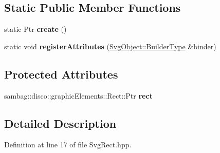 \subsection*{Static Public Member Functions}
\begin{DoxyCompactItemize}
\item 
\hypertarget{classsambag_1_1disco_1_1svg_1_1_svg_rect_aef9401a232a2222cfaa23405833ce3c0}{
static Ptr {\bfseries create} ()}
\label{classsambag_1_1disco_1_1svg_1_1_svg_rect_aef9401a232a2222cfaa23405833ce3c0}

\item 
\hypertarget{classsambag_1_1disco_1_1svg_1_1_svg_rect_af04b290fa1361836ebe9eb1b7477bbe3}{
static void {\bfseries registerAttributes} (\hyperlink{classsambag_1_1xml_1_1_x_m_l2_object}{SvgObject::BuilderType} \&binder)}
\label{classsambag_1_1disco_1_1svg_1_1_svg_rect_af04b290fa1361836ebe9eb1b7477bbe3}

\end{DoxyCompactItemize}
\subsection*{Protected Attributes}
\begin{DoxyCompactItemize}
\item 
\hypertarget{classsambag_1_1disco_1_1svg_1_1_svg_rect_a30b08002c5cfeef24733fa07c9897e6d}{
sambag::disco::graphicElements::Rect::Ptr {\bfseries rect}}
\label{classsambag_1_1disco_1_1svg_1_1_svg_rect_a30b08002c5cfeef24733fa07c9897e6d}

\end{DoxyCompactItemize}


\subsection{Detailed Description}


Definition at line 17 of file SvgRect.hpp.



